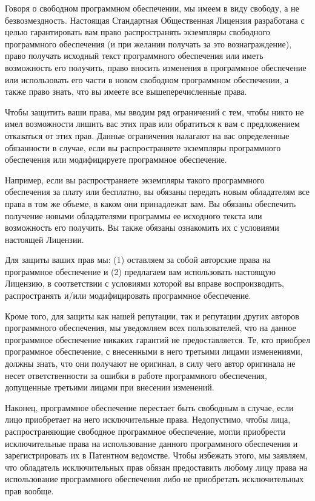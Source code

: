\begin{small}
Говоря о свободном программном обеспечении, мы имеем в виду свободу, а
не безвозмездность. Настоящая Стандартная Общественная Лицензия
разработана с целью гарантировать вам право распространять экземпляры
свободного программного обеспечения (и при желании получать за это
вознаграждение), право получать исходный текст программного обеспечения
или иметь возможность его получить, право вносить изменения в
программное обеспечение или использовать его части в новом свободном
программном обеспечении, а также право знать, что вы имеете все
вышеперечисленные права.

Чтобы защитить ваши права, мы вводим ряд ограничений с тем, чтобы никто
не имел возможности лишить вас этих прав или обратиться к вам с
предложением отказаться от этих прав. Данные ограничения налагают на вас
определенные обязанности в случае, если вы распространяете экземпляры
программного обеспечения или модифицируете программное обеспечение.

Например, если вы распространяете экземпляры такого программного
обеспечения за плату или бесплатно, вы обязаны передать новым обладателям
все права в том же объеме, в каком они принадлежат вам. Вы обязаны
обеспечить получение новыми обладателями программы ее исходного текста
или возможность его получить. Вы также обязаны ознакомить их с условиями
настоящей Лицензии.

Для защиты ваших прав мы: (1) оставляем за собой авторские права на
программное обеспечение и (2) предлагаем вам использовать настоящую
Лицензию, в соответствии с условиями которой вы вправе воспроизводить,
распространять и/или модифицировать программное обеспечение.

Кроме того, для защиты как нашей репутации, так и репутации других
авторов программного обеспечения, мы уведомляем всех пользователей, что
на данное программное обеспечение никаких гарантий не предоставляется.
Те, кто приобрел программное обеспечение, с внесенными в него третьими
лицами изменениями, должны знать, что они получают не оригинал, в силу
чего автор оригинала не несет ответственности за ошибки в работе
программного обеспечения, допущенные третьими лицами при внесении
изменений.

Наконец, программное обеспечение перестает быть свободным в случае, если
лицо приобретает на него исключительные права. Недопустимо, чтобы лица,
распространяющие свободное программное обеспечение, могли приобрести
исключительные права на использование данного программного обеспечения и
зарегистрировать их в Патентном ведомстве. Чтобы избежать этого, мы
заявляем, что обладатель исключительных прав обязан предоставить любому
лицу права на использование программного обеспечения либо не приобретать
исключительных прав вообще.


\end{small}
